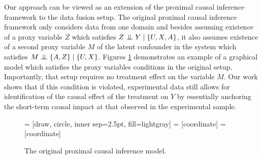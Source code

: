 \documentclass[10pt]{article}
\newcommand{\independent}{\perp\mkern-9.5mu\perp}
\begin{document}
Our approach can be viewed as an extension of the  proximal causal inference framework \citep{miao2018identifying,tchetgen2020introduction,cui2020semiparametric} to the data fusion setup.
The original proximal causal inference framework only considers data from one domain and besides assuming existence of a proxy variable $Z$ which satisfies $Z\independent Y\mid\{U,X,A\}$, it also assumes existence of a second proxy variable $M$ of the latent confounder in the system which satisfies $M\independent \{A,Z\}\mid\{U,X\}$. Figures \ref{fig:origprox} demonstrates an example of a graphical model which satisfies the proxy variables conditions in the original setup. Importantly, that setup requires no treatment effect on the variable $M$. Our work shows that if this condition is violated, experimental data still allows for identification of the causal effect of the treatment on $Y$ by essentially anchoring  the short-term causal impact at that observed in the experimental sample.

\begin{figure}[t]
\centering
		 = [draw, circle, inner sep=2.5pt, fill=lightgray]
		 = [coordinate]
		 = [coordinate]
        \caption{The original proximal causal inference model.}
        \label{fig:origprox}	
\end{figure}
\end{document}

